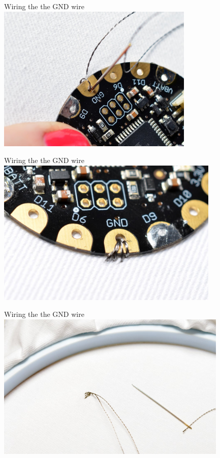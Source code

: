 \documentclass[aspectratio=169]{beamer}
\begin{document}
\begin{frame}[fragile]{Wiring the the GND wire}
\includegraphics[height=2.75in]{flora_DSC_0103.jpg}
\end{frame}
\begin{frame}[fragile]{Wiring the the GND wire}
\includegraphics[height=2.75in]{flora_DSC_0105.jpg}
\end{frame}
\begin{frame}[fragile]{Wiring the the GND wire}
\includegraphics[height=2.75in]{flora_DSC_0106.jpg}
\end{frame}
\end{document}
